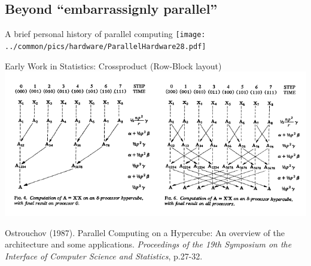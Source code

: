 \subsection{Beyond ``embarrassignly parallel''}
\makesubcontentsslidessec

\begin{frame}
  \begin{block}{A brief personal history of parallel computing}
  \texttt{[image: ../common/pics/hardware/ParallelHardware28.pdf]}
  \end{block}
\end{frame}

\begin{frame}{Early Work in Statistics: Crossproduct (Row-Block layout)}
  \includegraphics[width=\textwidth]
  {../common/pics/comm/Crossprod1987.png} \\
  \begin{block} {\scriptsize Ostrouchov (1987). Parallel Computing on a
      Hypercube: An overview of the architecture and some
      applications. {\em Proceedings of the 19th Symposium on the
        Interface of Computer Science and Statistics}, p.27-32.}
  \end{block}
\end{frame}

